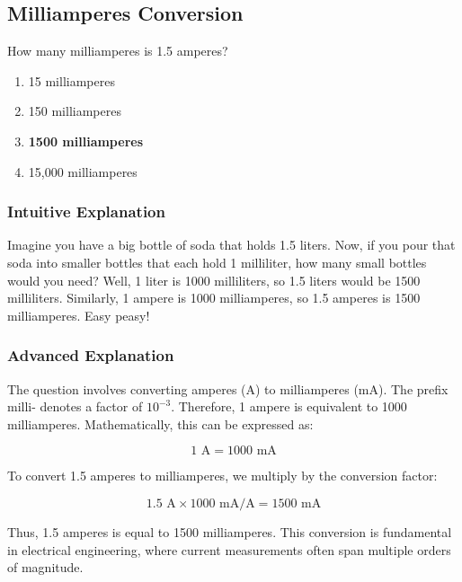 \subsection{Milliamperes Conversion}
\label{T5B01}

\begin{tcolorbox}[colback=gray!10!white,colframe=black!75!black,title=T5B01]
How many milliamperes is 1.5 amperes?
\begin{enumerate}[label=\Alph*)]
    \item 15 milliamperes
    \item 150 milliamperes
    \item \textbf{1500 milliamperes}
    \item 15,000 milliamperes
\end{enumerate}
\end{tcolorbox}

\subsubsection{Intuitive Explanation}
Imagine you have a big bottle of soda that holds 1.5 liters. Now, if you pour that soda into smaller bottles that each hold 1 milliliter, how many small bottles would you need? Well, 1 liter is 1000 milliliters, so 1.5 liters would be 1500 milliliters. Similarly, 1 ampere is 1000 milliamperes, so 1.5 amperes is 1500 milliamperes. Easy peasy!

\subsubsection{Advanced Explanation}
The question involves converting amperes (A) to milliamperes (mA). The prefix milli- denotes a factor of \(10^{-3}\). Therefore, 1 ampere is equivalent to 1000 milliamperes. Mathematically, this can be expressed as:

\[
1 \text{ A} = 1000 \text{ mA}
\]

To convert 1.5 amperes to milliamperes, we multiply by the conversion factor:

\[
1.5 \text{ A} \times 1000 \text{ mA/A} = 1500 \text{ mA}
\]

Thus, 1.5 amperes is equal to 1500 milliamperes. This conversion is fundamental in electrical engineering, where current measurements often span multiple orders of magnitude.

